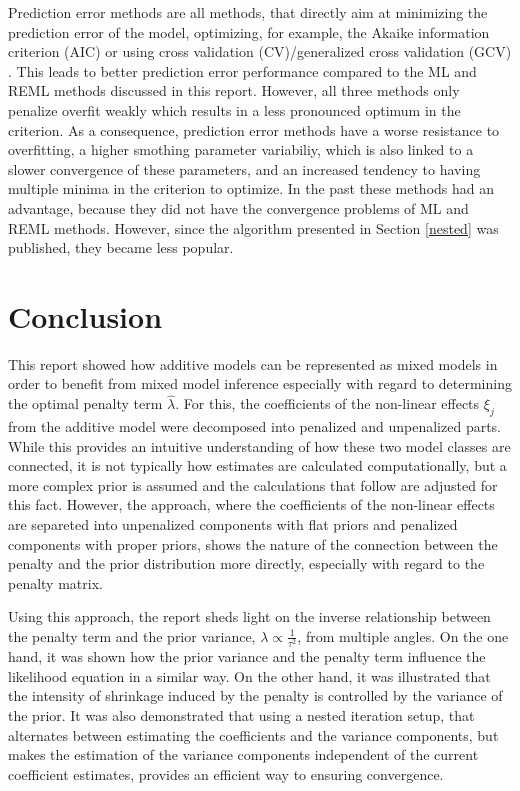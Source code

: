 \documentclass[12pt]{article}
\begin{document}
Prediction error methods are all methods, that directly aim at minimizing the prediction error of the model, optimizing, for example, the Akaike information criterion (AIC) or using cross validation (CV)/generalized cross validation (GCV) \cite{wood2011fast}. This leads to better prediction error performance compared to the ML and REML methods discussed in this report. However, all three methods only penalize overfit weakly which results in a less pronounced optimum in the criterion. As a consequence, prediction error methods have a worse resistance to overfitting, a higher smothing parameter variabiliy, which is also linked to a slower convergence of these parameters, and an increased tendency to having multiple minima in the criterion to optimize. In the past these methods had an advantage, because they did not have the convergence problems of ML and REML methods. However, since the algorithm presented in Section \ref{nested} was published, they became less popular.


\section{Conclusion} %

This report showed how additive models can be represented as mixed models in order to benefit from mixed model inference especially with regard to determining the optimal penalty term $\hat{\lambda}$. 
For this, the coefficients of the non-linear effects $\xi_j$ from the additive model were decomposed into penalized and unpenalized parts. While this provides an intuitive understanding of how these two model classes are 
connected, it is not typically how estimates are calculated computationally, but a more complex prior is assumed and the calculations that follow are adjusted for this fact. However, the approach, where the coefficients of the non-linear effects are separeted into unpenalized components with flat priors and penalized components with proper priors, shows the nature of the connection between the penalty and the prior distribution more directly, especially with regard to the penalty matrix.

Using this approach, the report sheds light on the inverse relationship between the penalty term and the prior variance, $\lambda \propto \frac{1}{\tau^2}$, from multiple angles. On the one hand, it was shown how the prior variance and the penalty term influence the likelihood equation in a similar way. On the other hand, it was illustrated that the intensity of shrinkage induced by the penalty is controlled by the variance of the prior. It was also demonstrated that using a nested iteration setup, that alternates between estimating the coefficients and the variance components, but makes the estimation of the variance components independent of the current coefficient estimates, provides an efficient way to ensuring convergence.
\end{document}
